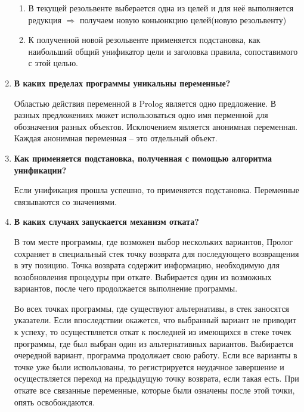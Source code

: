 \begin{enumerate}
        \begin{enumerate}
            \item В текущей резольвенте выберается одна из целей и для неё выполняется редукция $\Rightarrow$ получаем новую коньюнкцию целей(новую резольвенту)
            \item К полученной новой резольвенте применяется подстановка, как наибольший общий унификатор цели и заголовка правила, сопоставимого с этой целью.
        \end{enumerate}

    \item \textbf{В каких пределах программы уникальны переменные? }

        Областью действия переменной в Prolog является одно предложение. В разных предложениях может использоваться одно имя перменной для обозначения разных объектов. Исключением является анонимная переменная. Каждая анонимная переменная -- это отдельный объект.

    \item \textbf{Как применяется подстановка, полученная с помощью алгоритма унификации?}

        Если унификация прошла успешно, то применяется подстановка. Переменные связываются со значениями.

    \item \textbf{В каких случаях запускается механизм отката?}

        В том месте программы, где возможен выбор нескольких вариантов, Пролог сохраняет в специальный стек точку возврата для последующего возвращения в эту позицию. Точка возврата содержит информацию, необходимую для возобновления процедуры при откате. Выбирается один из возможных вариантов, после чего продолжается выполнение программы.

Во всех точках программы, где существуют альтернативы, в стек заносятся указатели. Если впоследствии окажется, что выбранный вариант не приводит к успеху, то осуществляется откат к последней из имеющихся в стеке точек программы, где был выбран один из альтернативных вариантов. Выбирается очередной вариант, программа продолжает свою работу. Если все варианты в точке уже были использованы, то регистрируется неудачное завершение и осуществляется переход на предыдущую точку возврата, если такая есть. При откате все связанные переменные, которые были означены после этой точки, опять освобождаются.
\end{enumerate}
